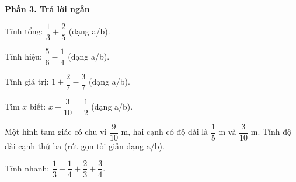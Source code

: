 \textbf{Phần 3. Trả lời ngắn}

\begin{ex} %
Tính tổng: $\dfrac{1}{3} + \dfrac{2}{5}$ (dạng a/b).
\end{ex}

\begin{ex} %
Tính hiệu: $\dfrac{5}{6} - \dfrac{1}{4}$ (dạng a/b).
\end{ex}

\begin{ex} %
Tính giá trị: $1 + \dfrac{2}{7} - \dfrac{3}{7}$ (dạng a/b).
\end{ex}

\begin{ex} %
Tìm $x$ biết: $x - \dfrac{3}{10} = \dfrac{1}{2}$ (dạng a/b).
\end{ex}

\begin{ex} %
Một hình tam giác có chu vi $\dfrac{9}{10}\text{ m}$, hai cạnh có độ dài là $\dfrac{1}{5}\text{ m}$ và $\dfrac{3}{10}\text{ m}$. Tính độ dài cạnh thứ ba (rút gọn tối giản dạng a/b).
\end{ex}

\begin{ex} %
Tính nhanh: $\dfrac{1}{3} + \dfrac{1}{4} + \dfrac{2}{3} + \dfrac{3}{4}$.
\end{ex}
